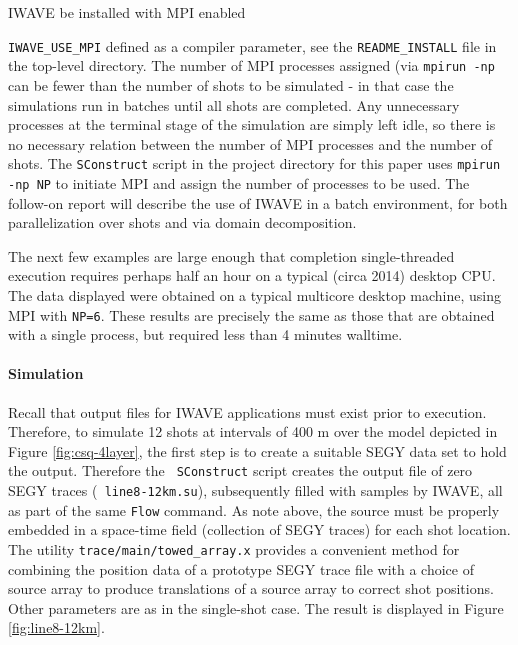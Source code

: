 IWAVE be installed with MPI enabled {{\tt IWAVE\_USE\_MPI} defined as a
compiler parameter, see the {\tt README\_INSTALL} file in the top-level
directory. The number of MPI processes assigned (via {\tt mpirun -np}
can be fewer than the number of shots to be simulated - in that case
the simulations run in batches until all shots are completed. Any
unnecessary processes at the terminal stage of the simulation are simply left
idle, so there is no necessary relation between the number of MPI
processes and the number of shots. The {\tt SConstruct} script in the
project directory for this paper uses {\tt mpirun -np NP} to initiate
MPI and assign the number of processes to be used. The follow-on
report will describe the use of IWAVE in a batch environment, for both
parallelization over shots and via domain decomposition.

The next few examples are large enough that completion single-threaded
execution requires perhaps half an hour on a typical (circa 2014) desktop
CPU.  The data displayed were obtained on a typical multicore desktop
machine, using MPI with {\tt NP=6}. These results are precisely the
same as those that are obtained with a single process, but required
less than 4 minutes walltime.

\noindent \paragraph{Simulation}
Recall that output files for IWAVE applications must exist prior to
execution. Therefore, to simulate 12 shots at intervals of 400 m over
the model depicted in Figure \ref{fig:csq-4layer}, the first step is
to create a suitable SEGY data set to hold the output. Therefore the {\tt
  SConstruct} script creates the output file of zero SEGY traces ({\tt
  line8-12km.su}), subsequently filled with samples by IWAVE, all as
part of the same {\tt Flow} command. As note above, the source must
be properly embedded in a space-time field (collection of SEGY traces)
for each shot location. The utility {\tt trace/main/towed\_array.x}
provides a convenient method for combining the position data of a
prototype SEGY trace file with a choice of source array to produce
translations of a source array to correct shot positions. Other
parameters are as in the single-shot case. The result is displayed in
Figure \ref{fig:line8-12km}.


}
